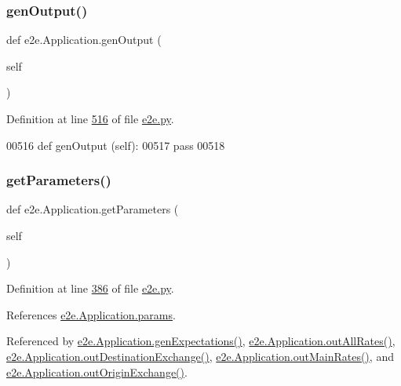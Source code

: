 \subsubsection{\texorpdfstring{gen\+Output()}{genOutput()}}
{\footnotesize\ttfamily def e2e.\+Application.\+gen\+Output (\begin{DoxyParamCaption}\item[{}]{self }\end{DoxyParamCaption})}



Definition at line \hyperlink{e2e_8py_source_l00516}{516} of file \hyperlink{e2e_8py_source}{e2e.\+py}.


\begin{DoxyCode}
00516     \textcolor{keyword}{def }genOutput (self):
00517         \textcolor{keywordflow}{pass}
00518 
\end{DoxyCode}
\mbox{\label{classe2e_1_1_application_ae7bc7b58f19d681635cfa8ae06d9769b}} 
\subsubsection{\texorpdfstring{get\+Parameters()}{getParameters()}}
{\footnotesize\ttfamily def e2e.\+Application.\+get\+Parameters (\begin{DoxyParamCaption}\item[{}]{self }\end{DoxyParamCaption})}



Definition at line \hyperlink{e2e_8py_source_l00386}{386} of file \hyperlink{e2e_8py_source}{e2e.\+py}.



References \hyperlink{e2e_8py_source_l00138}{e2e.\+Application.\+params}.



Referenced by \hyperlink{e2e_8py_source_l00487}{e2e.\+Application.\+gen\+Expectations()}, \hyperlink{e2e_8py_source_l00398}{e2e.\+Application.\+out\+All\+Rates()}, \hyperlink{e2e_8py_source_l00452}{e2e.\+Application.\+out\+Destination\+Exchange()}, \hyperlink{e2e_8py_source_l00389}{e2e.\+Application.\+out\+Main\+Rates()}, and \hyperlink{e2e_8py_source_l00417}{e2e.\+Application.\+out\+Origin\+Exchange()}.


